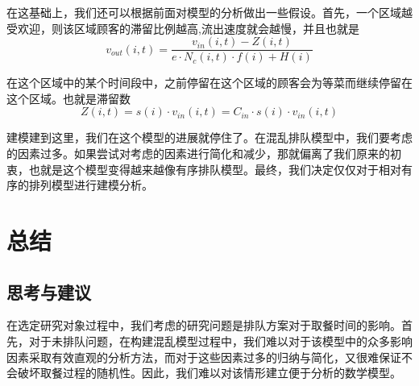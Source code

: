 \documentclass[lang=cn,10pt,a4paper]{elegantpaper}
\begin{document}
在这基础上，我们还可以根据前面对模型的分析做出一些假设。首先，一个区域越受欢迎，则该区域顾客的滞留比例越高,流出速度就会越慢，并且也就是
\begin{equation}
v_{out}(i,t)=\frac{v_{in}(i,t)-Z(i,t)}{e \cdot N_c(i,t) \cdot f(i)+H(i)}
\end{equation}


在这个区域中的某个时间段中，之前停留在这个区域的顾客会为等菜而继续停留在这个区域。也就是滞留数
\begin{equation}
Z(i,t) = s(i) \cdot v_{in}(i,t)=C_{in} \cdot s(i) \cdot v_{in}(i,t)
\end{equation}


建模建到这里，我们在这个模型的进展就停住了。在混乱排队模型中，我们要考虑的因素过多。如果尝试对考虑的因素进行简化和减少，那就偏离了我们原来的初衷，也就是这个模型变得越来越像有序排队模型。最终，我们决定仅仅对于相对有序的排列模型进行建模分析。
\section{总结}
\subsection{思考与建议}
在选定研究对象过程中，我们考虑的研究问题是排队方案对于取餐时间的影响。首先，对于未排队问题，在构建混乱模型过程中，我们难以对于该模型中的众多影响因素采取有效直观的分析方法，而对于这些因素过多的归纳与简化，又很难保证不会破坏取餐过程的随机性。因此，我们难以对该情形建立便于分析的数学模型。
\end{document}
